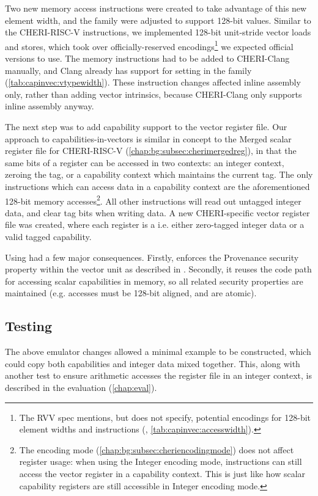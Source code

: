 \documentclass[../thesis]{subfiles}
\begin{document}
Two new memory access instructions were created to take advantage of this new element width, and the  family were adjusted to support 128-bit values.
Similar to the CHERI-RISC-V  instructions, we implemented 128-bit unit-stride vector loads and stores, which took over officially-reserved encodings\footnote{The RVV spec mentions, but does not specify, potential encodings for 128-bit element widths and instructions (\cite[p10, p32]{specification-RVV-v1.0}, \cref{tab:capinvec:accesswidth}).} we expected official versions to use.
The memory instructions had to be added to CHERI-Clang manually, and Clang already has support for setting  in the  family (\cref{tab:capinvec:vtypewidth}).
These instruction changes affected inline assembly only, rather than adding vector intrinsics, because CHERI-Clang only supports inline assembly anyway.

% 

The next step was to add capability support to the vector register file.
Our approach to capabilities-in-vectors is similar in concept to the Merged scalar register file for CHERI-RISC-V (\cref{chap:bg:subsec:cherimergedreg}), in that the same bits of a register can be accessed in two contexts: an integer context, zeroing the tag, or a capability context which maintains the current tag.
The only instructions which can access data in a capability context are the aforementioned 128-bit memory accesses\footnote{The encoding mode (\cref{chap:bg:subsec:cheriencodingmode}) does not affect register usage: when using the Integer encoding mode, instructions can still access the vector register in a capability context. This is just like how scalar capability registers are still accessible in Integer encoding mode.}.
All other instructions will read out untagged integer data, and clear tag bits when writing data.
A new CHERI-specific vector register file was created, where each register is a   i.e. either zero-tagged integer data or a valid tagged capability.

Using  had a few major consequences.
Firstly,  enforces the Provenance security property within the vector unit as described in \todoref{}.
Secondly, it reuses the code path for accessing scalar capabilities in memory, so all related security properties are maintained (e.g. accesses must be 128-bit aligned, and are atomic).

\subsection{Testing}
The above emulator changes allowed a minimal  example to be constructed, which could copy both capabilities and integer data mixed together.
This, along with another test to ensure arithmetic accesses the register file in an integer context, is described in the evaluation (\cref{chap:eval}).


\end{document}
